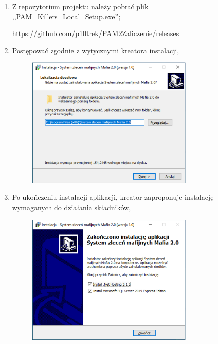 \documentclass[12pt,a4paper]{article}
\begin{document}
			\begin{enumerate}
				\item Z repozytorium projektu należy pobrać plik ,,PAM\_Killers\_Local\_Setup.exe'';
					\begin{tcolorbox}[minipage,colback=white,arc=0pt,outer arc=0pt, fontupper=\footnotesize]
						\url{https://github.com/p10trek/PAM2Zaliczenie/releases}
					\end{tcolorbox}
					
				\item Postępować zgodnie z wytycznymi kreatora instalacji,
					\begin{figure}[H]
						\centering
						\includegraphics[width=8cm]{img/Local_Install_1.eps}
					\end{figure}


				
				\item Po ukończeniu instalacji aplikacji, kreator zaproponuje instalację wymaganych do działania składników,
					\begin{figure}[H]
						\centering
						\includegraphics[width=8cm]{img/Local_Install_2.eps}
					\end{figure}		
					

\end{enumerate}
\end{document}
